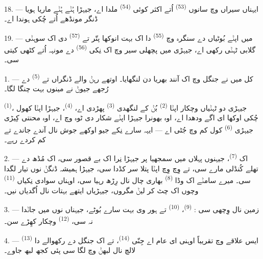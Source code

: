 18. --- ایہناں سیراں وچ سانوں  \textsuperscript{(53)} اُتے اکثر کوئی
 \textsuperscript{(54)} ملدا اے، جیہڑا ہُݨے ہُݨے ماریا ہویا
ڈنگر مونڈھے اُتے چُکی ہوندا اے۔

19. --- میں اپݨے بُوٹیاں دے سنگرہ وچ  \textsuperscript{(55)} دا اک بہت
انوکھا پتّر تے  \textsuperscript{(57)} دی اک سوہݨی گلابی ٹہݨی رکھی اے،
جیہڑی میں پچھلی سیر وچ اک نِکی  \textsuperscript{(56)} دے مونہہ اُتے
کٹھی کیتی سی۔

\VUsaut{3.0mm}
\VUsaut{3.0mm}

\VUsaut{3.0mm}

1. --- کل میں نے جنگل وچ اک آنند بھریا دن لنگھایا۔ اوتھے رہݨ والے ڈنگراں تے
 \textsuperscript{(5)} دے رُجھے جیوݨ نے مینوں بہت چنگا لگا۔

 \textsuperscript{(1)}، جیہڑی دو ٹہݨیاں وچکار اپݨا 
\textsuperscript{(2)} بُݨ کے لنگھدی  \textsuperscript{(3)} پھڑدی اے،
 \textsuperscript{(4)}، جیہڑا اپݨا کھول چُکی اوکھا ای اگے ودھدا اے،
اوہ بھونرا جیہڑا اپݨے شکار دی ٹوہ وچ اے، اوہ محنتی کِیڑی جیہڑی 
\textsuperscript{(6)} کول کم وچ جُٹی اے — ایہہ سارے نِکے جیو اوکھے جوش نال آندے
جاندے تے کم کردے رہے۔

2. --- اک  \textsuperscript{(7)}، جیہنوں پہلاں میں  سمجھیا
پر جیہڑا نِرا اک بے قصور  سی، اک مُڈھ دے تھلے کُنڈلی مارے سی،
تے وِچ وِچ اپݨا پتلا سر کڈدا سی، جیہڑا ہمیشہ ڈنگݨ نوں تیار لگدا سی۔ میرے سامݨے
اک وڈا  \textsuperscript{(8)} بھاری چال نال رِڑھ رہیا سی، اوہناں سوادی
نِکیاں  \textsuperscript{(11)} وچوں اک چٹ کر لیݨ مگروں،
جیہڑیاں ایتھے بہتات نال اُگدیاں نیں۔

3. --- زمین  نال وِچھی سی : 
\textsuperscript{(9)}،  \textsuperscript{(10)} تے ہور وی بہت سارے
بُوٹے، جیہناں نوں میں جاݨدا نہ سی،  \textsuperscript{(12)}
وچکار کھِڑے سن۔

4. --- ایس علاقے وچ  تقریباً اوہنی ای عام اے جِنّی 
\textsuperscript{(14)}، تے اک جنگل دے رکھوالے دا 
\textsuperscript{(13)} لالچ نال لبھݨ وچ لگا سی پئی کجھ لبھ جاوے۔

\VUsaut{3.0mm}
\VUsaut{3.0mm}

